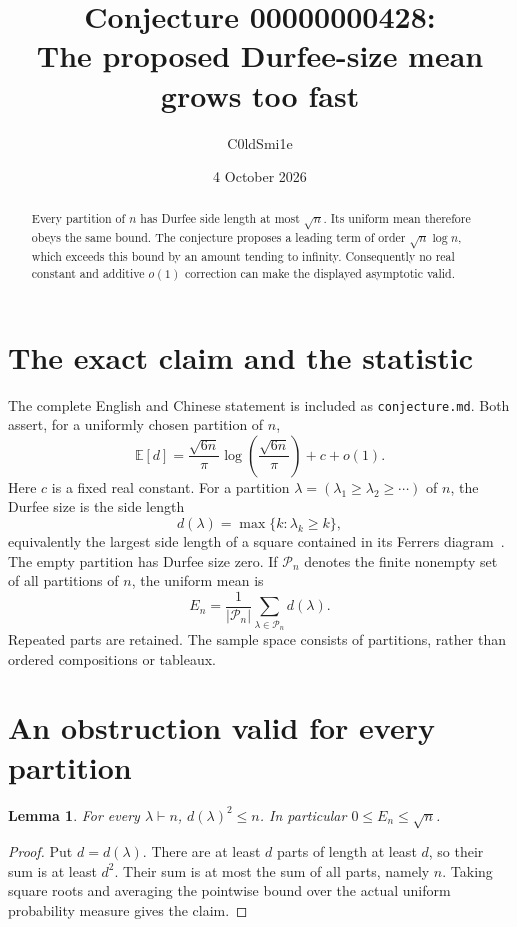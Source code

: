 \documentclass[10pt]{article}
\title{Conjecture 00000000428:\\The proposed Durfee-size mean grows too fast}
\author{C0ldSmi1e}
\date{4 October 2026}
\newtheorem{lemma}{Lemma}
\newcommand{\E}{\mathbb E}
\begin{document}
\maketitle
\begin{abstract}
Every partition of $n$ has Durfee side length at most $\sqrt n$. Its uniform mean therefore obeys the same bound. The conjecture proposes a leading term of order $\sqrt n\log n$, which exceeds this bound by an amount tending to infinity. Consequently no real constant and additive $o(1)$ correction can make the displayed asymptotic valid.
\end{abstract}

\section{The exact claim and the statistic}
The complete English and Chinese statement is included as \texttt{conjecture.md}. Both assert, for a uniformly chosen partition of $n$,
\begin{equation}\label{claim}
 \E[d]=\frac{\sqrt{6n}}{\pi}\log\!\left(\frac{\sqrt{6n}}{\pi}\right)+c+o(1).
\end{equation}
Here $c$ is a fixed real constant. For a partition $\lambda=(\lambda_1\ge\lambda_2\ge\cdots)$ of $n$, the Durfee size is the side length
\[
 d(\lambda)=\max\{k:\lambda_k\ge k\},
\]
equivalently the largest side length of a square contained in its Ferrers diagram~\cite[\S2.1]{pakpanova}. The empty partition has Durfee size zero. If $\mathcal P_n$ denotes the finite nonempty set of all partitions of $n$, the uniform mean is
\[
 E_n=\frac{1}{|\mathcal P_n|}\sum_{\lambda\in\mathcal P_n}d(\lambda).
\]
Repeated parts are retained. The sample space consists of partitions, rather than ordered compositions or tableaux.

\section{An obstruction valid for every partition}
\begin{lemma}\label{area}
For every $\lambda\vdash n$, $d(\lambda)^2\le n$. In particular $0\le E_n\le\sqrt n$.
\end{lemma}
\begin{proof}
Put $d=d(\lambda)$. There are at least $d$ parts of length at least $d$, so their sum is at least $d^2$. Their sum is at most the sum of all parts, namely $n$. Taking square roots and averaging the pointwise bound over the actual uniform probability measure gives the claim.
\end{proof}
\end{document}
